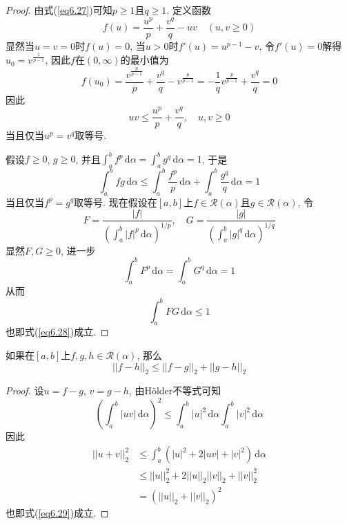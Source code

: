 \documentclass[cn,12pt,math=mtpro2,citestyle=gb7714-2015,bibstyle=gb7714-2015,twocol]{elegantbook}
\newcommand{\da}{\,\text{d}\alpha}
\newcommand{\RR}{\mathscr{R}}
\begin{document}
\begin{proof}
  由式(\ref{eq6.27})可知$p\geq1$且$q\geq1$. 定义函数
  $$f(u)=\frac{u^p}{p}+\frac{v^q}{q}-uv\quad(u,v\geq 0)$$
  显然当$u=v=0$时$f(u)=0$, 当$u>0$时$f'(u)=u^{p-1}-v$, 令$f'(u)=0$解得$u_0=\displaystyle v^{\frac{1}{p-1}}$, 因此$f$在$(0,\infty)$的最小值为
  $$f(u_0)=\frac{v^{\frac{p}{p-1}}}{p}+\frac{v^q}{q}-v^{\frac{p}{p-1}}=-\frac{1}{q}v^{\frac{p}{p-1}}+\frac{v^q}{q}=0$$
  因此
  $$uv\leq\frac{u^p}{p}+\frac{v^q}{q}, \quad u,v\geq0$$
  当且仅当$u^p=v^q$取等号.

  假设$f\geq0$, $g\geq0$, 并且$\int_{a}^{b}f^p\da=\int_{a}^{b}g^q\da=1$, 于是
  $$\int_{a}^{b}fg\da\leq\int_{a}^{b}\frac{f^p}{p}\da+\int_{a}^{b}\frac{g^q}{q}\da=1$$
  当且仅当$f^p=g^q$取等号. 现在假设在$[a,b]$上$f\in\RR(\alpha)$且$g\in\RR(\alpha)$, 令
  $$F=\frac{|f|}{\left(\int_{a}^{b}|f|^p\da\right)^{1/p}},\quad G=\frac{|g|}{\left(\int_{a}^{b}|g|^q\da\right)^{1/q}}$$
  显然$F,G\geq0$, 进一步
  $$\int_{a}^{b}F^p\da=\int_{a}^{b}G^q\da=1$$
  从而$$\displaystyle\int_{a}^{b}FG\da\leq 1$$
  也即式(\ref{eq6.28})成立.
\end{proof}
\begin{theorem}[三角不等式]
  如果在$[a,b]$上$f, g, h\in\mathscr{R}(\alpha)$, 那么
  \begin{equation}\label{eq6.29}
    ||f-h||_2\leq ||f-g||_2+||g-h||_2
  \end{equation}
\end{theorem}
\begin{proof}
  设$u=f-g$, $v=g-h$, 由Hölder不等式可知
  $$\left(\int_{a}^{b}|uv|\da\right)^2\leq\int_{a}^{b}|u|^2\da\int_{a}^{b}|v|^2\da$$
  因此
  \begin{align*}
  ||u+v||_2^2&\leq\int_{a}^{b}(|u|^2+2|uv|+|v|^2)\da \\
  &\leq ||u||_2^2+2||u||_2||v||_2+||v||_2^2 \\
  &=(||u||_2+||v||_2)^2
  \end{align*}
  也即式(\ref{eq6.29})成立.

\end{proof}
\end{document}
